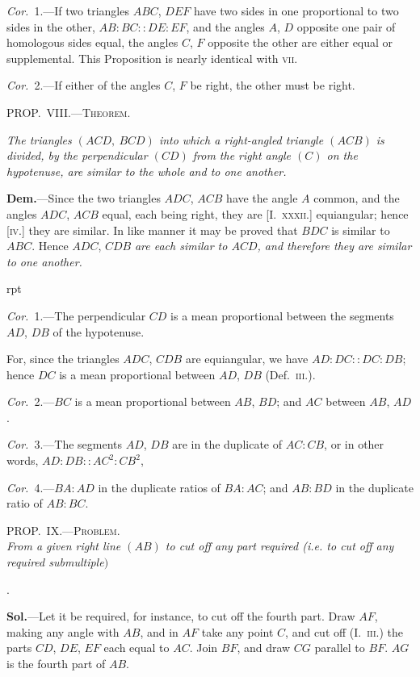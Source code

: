 \documentclass[oneside]{book}
\newcounter{wrapwidth}
\newcommand\myprop[2]{
\bigskip\Needspace*{4\baselineskip}\begin{center}\textsc{#1}\\\medskip\emph{#2}\par\end{center}
}
\newcommand\mypropl[2]{
\bigskip\Needspace*{4\baselineskip}\begin{center}\textsc{#1}\end{center}
\hspace{\parindent}\emph{#2}\par\medskip
}
\newcommand\imgflow[3]{
\setcounter{wrapwidth}{#1}

\begin{wrapfigure}[#2]{r}{\value{wrapwidth}pt}
\begin{center}
\vspace{-0.3in}

\end{center}
\end{wrapfigure}
}
\begin{document}
\emph{Cor.}~1.---If two triangles $ABC$, $DEF$ have two sides
in one proportional to two sides in the other, $AB:BC
::DE:EF$, and the angles $A$, $D$ opposite one pair of
homologous sides equal, the angles $C$, $F$ opposite the
other are either equal or supplemental. This Proposition
is nearly identical with \textsc{vii.}

\emph{Cor.}~2.---If either of the angles $C$, $F$ be right, the
other must be right.

\mypropl{PROP\@.~VIII\@.---Theorem.}{The triangles $(ACD,\ BCD)$ into which a right-angled
triangle $(ACB)$ is divided, by the perpendicular $(CD)$ from
the right angle $(C)$ on the hypotenuse, are similar to the
whole and to one another.}



\textbf{Dem.}---Since the two triangles $ADC$, $ACB$ have the
angle $A$ common, and the angles
$ADC$, $ACB$ equal, each being
right, they are [I.~\textsc{xxxii.}] equiangular;
hence [\textsc{iv}.] they are
similar. In like manner it may
be proved that $BDC$ is similar
to $ABC$. Hence $ADC$, $CDB$ \textit{are
each similar to $ACD$, and therefore they are similar to one
another.}


\imgflow{110}{6}{f176}

\emph{Cor.}~1.---The perpendicular $CD$ is a mean proportional
between the segments $AD$, $DB$ of the hypotenuse.

For, since the triangles $ADC$, $CDB$ are equiangular,
we have $AD:DC::DC:DB$; hence $DC$ is a mean
proportional between $AD$, $DB$ (Def.~\textsc{iii.}).

\emph{Cor.}~2.---$BC$ is a mean proportional between $AB$,
$BD$; and $AC$ between $AB$, $AD$.

\emph{Cor.}~3.---The segments $AD$, $DB$ are in the duplicate
of $AC:CB$, or in other words, $AD:DB::AC^2:CB^2$,

\emph{Cor.}~4.---$BA:AD$ in the duplicate ratios of $BA:AC$;
and $AB:BD$ in the duplicate ratio of $AB:BC$.

\myprop{PROP\@.~IX\@.---Problem.}{From a given right line $(AB)$ to cut off any part required
\textrm{(i.e.} to cut off any required submultiple$)$}.

\textbf{Sol.}---Let it be required, for instance, to cut off the
fourth part. Draw $AF$, making any angle with $AB$,
and in $AF$ take any point $C$, and cut off (I.~\textsc{iii.}) the
parts $CD$, $DE$, $EF$ each equal to $AC$. Join $BF$, and
draw $CG$ parallel to $BF$. $AG$ is the fourth part of
$AB$.
\end{document}
